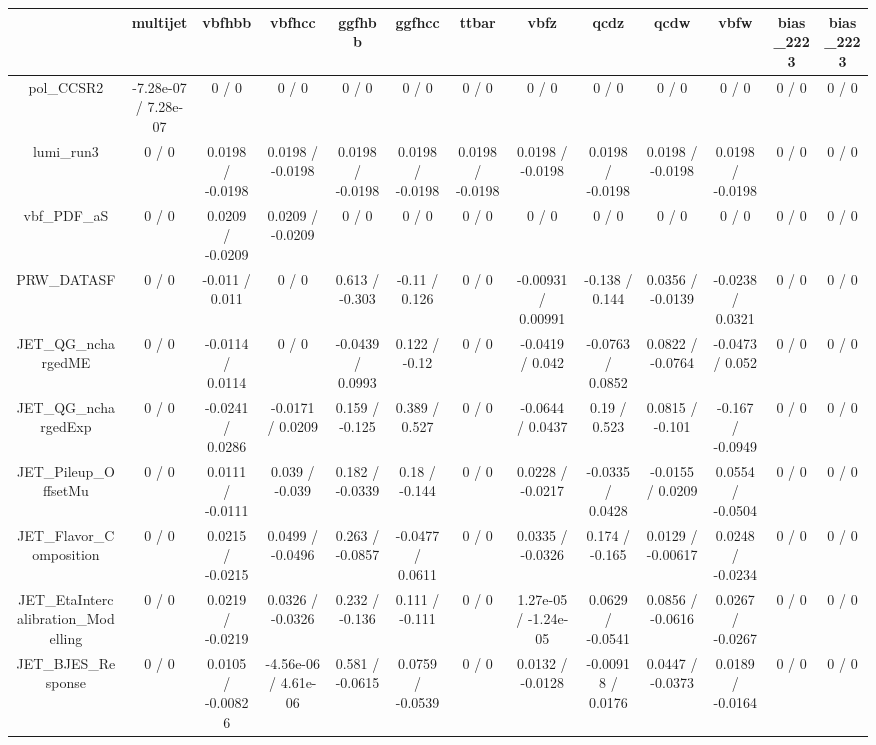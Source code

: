 \documentclass[10pt]{article}
\begin{document}
\begin{table}[htbp]
\begin{center}
\begin{tabular}{|c|c|c|c|c|c|c|c|c|c|c|c|c|}
\hline 
      & multijet      & vbfhbb      & vbfhcc      & ggfhbb      & ggfhcc      & ttbar      & vbfz      & qcdz      & qcdw      & vbfw      & bias_2223      & bias_2223 \\ 
\hline 
  pol_CCSR2 & -7.28e-07 / 7.28e-07 & 0 / 0 & 0 / 0 & 0 / 0 & 0 / 0 & 0 / 0 & 0 / 0 & 0 / 0 & 0 / 0 & 0 / 0 & 0 / 0 & 0 / 0 \\ 
  lumi_run3 & 0 / 0 & 0.0198 / -0.0198 & 0.0198 / -0.0198 & 0.0198 / -0.0198 & 0.0198 / -0.0198 & 0.0198 / -0.0198 & 0.0198 / -0.0198 & 0.0198 / -0.0198 & 0.0198 / -0.0198 & 0.0198 / -0.0198 & 0 / 0 & 0 / 0 \\ 
  vbf_PDF_aS & 0 / 0 & 0.0209 / -0.0209 & 0.0209 / -0.0209 & 0 / 0 & 0 / 0 & 0 / 0 & 0 / 0 & 0 / 0 & 0 / 0 & 0 / 0 & 0 / 0 & 0 / 0 \\ 
  PRW_DATASF & 0 / 0 & -0.011 / 0.011 & 0 / 0 & 0.613 / -0.303 & -0.11 / 0.126 & 0 / 0 & -0.00931 / 0.00991 & -0.138 / 0.144 & 0.0356 / -0.0139 & -0.0238 / 0.0321 & 0 / 0 & 0 / 0 \\ 
  JET_QG_nchargedME & 0 / 0 & -0.0114 / 0.0114 & 0 / 0 & -0.0439 / 0.0993 & 0.122 / -0.12 & 0 / 0 & -0.0419 / 0.042 & -0.0763 / 0.0852 & 0.0822 / -0.0764 & -0.0473 / 0.052 & 0 / 0 & 0 / 0 \\ 
  JET_QG_nchargedExp & 0 / 0 & -0.0241 / 0.0286 & -0.0171 / 0.0209 & 0.159 / -0.125 & 0.389 / 0.527 & 0 / 0 & -0.0644 / 0.0437 & 0.19 / 0.523 & 0.0815 / -0.101 & -0.167 / -0.0949 & 0 / 0 & 0 / 0 \\ 
  JET_Pileup_OffsetMu & 0 / 0 & 0.0111 / -0.0111 & 0.039 / -0.039 & 0.182 / -0.0339 & 0.18 / -0.144 & 0 / 0 & 0.0228 / -0.0217 & -0.0335 / 0.0428 & -0.0155 / 0.0209 & 0.0554 / -0.0504 & 0 / 0 & 0 / 0 \\ 
  JET_Flavor_Composition & 0 / 0 & 0.0215 / -0.0215 & 0.0499 / -0.0496 & 0.263 / -0.0857 & -0.0477 / 0.0611 & 0 / 0 & 0.0335 / -0.0326 & 0.174 / -0.165 & 0.0129 / -0.00617 & 0.0248 / -0.0234 & 0 / 0 & 0 / 0 \\ 
  JET_EtaIntercalibration_Modelling & 0 / 0 & 0.0219 / -0.0219 & 0.0326 / -0.0326 & 0.232 / -0.136 & 0.111 / -0.111 & 0 / 0 & 1.27e-05 / -1.24e-05 & 0.0629 / -0.0541 & 0.0856 / -0.0616 & 0.0267 / -0.0267 & 0 / 0 & 0 / 0 \\ 
  JET_BJES_Response & 0 / 0 & 0.0105 / -0.00826 & -4.56e-06 / 4.61e-06 & 0.581 / -0.0615 & 0.0759 / -0.0539 & 0 / 0 & 0.0132 / -0.0128 & -0.00918 / 0.0176 & 0.0447 / -0.0373 & 0.0189 / -0.0164 & 0 / 0 & 0 / 0 \\ 

\end{tabular}
\end{center}
\end{table}
\end{document}
